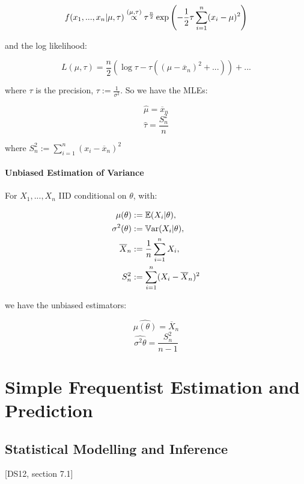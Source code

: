 \documentclass[a4paper]{article}
\begin{document}
                \[
                    f(x_1, ..., x_n | \mu, \tau) \stackrel{({\mu, \tau})}{\propto}
                    \tau^\frac{n}{2} \exp\left(-\frac{1}{2}\tau \sum_{i=1}^n
                    (x_i - \mu)^2\right)
                \]

                and the log likelihood:

                \[
                    L(\mu, \tau) = \frac{n}{2}(\log\tau - \tau((\mu - \overline
                    x_n)^2 + ...)) + ...
                \]

                where $\tau$ is the precision, $\tau := \frac{1}{\sigma^2}$. So
                we have the MLEs:

                \[
                    \widehat \mu = \overline x_n
                \]
                \[
                    \widehat \tau = \frac{S_n^2}{n}
                \]

                where $S_n^2 := \sum\limits_{i=1}^n (x_i - \overline x_n)^2$

            \paragraph{Unbiased Estimation of Variance}
                For $X_1, ..., X_n$ IID conditional on $\theta$, with:

                \begin{align*}
                    \mu(\theta) & := \mathbb{E}(X_i | \theta), \\
                    \sigma^2(\theta) & := \mathbb{V}\text{ar}(X_i | \theta), \\
                    \overline X_n & := \frac{1}{n} \sum\limits_{i=1}^n X_i, \\
                    S_n^2 & := \sum\limits_{i=1}^n (X_i - \overline X_n)^2
                \end{align*}

                we have the unbiased estimators:

                \[
                    \widehat {\mu(\theta)} = \overline X_n
                \]
                \[
                    \widehat {\sigma^2{\theta}} = \frac{S_n^2}{n - 1}
                \]

    \newpage
    \section{Simple Frequentist Estimation and Prediction}
        \subsection{Statistical Modelling and Inference}
            \begin{fread}
                [MR03, section 7.1]

                [DS12, section 7.1]
            \end{fread}
\end{document}
